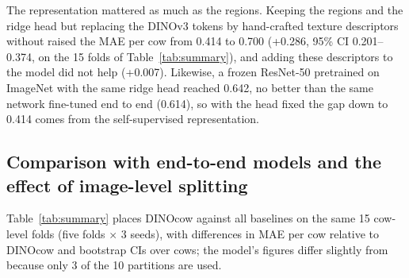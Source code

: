 \begin{table}[!htbp]
  \centering
  \caption{Region descriptor against simpler descriptors from the same frozen tokens (leave-one-cow-out).}
  \label{tab:regions}
\end{table}


\begin{cambio}
The representation mattered as much as the regions.
Keeping the regions and the ridge head but replacing the DINOv3 tokens by hand-crafted texture descriptors without  raised the MAE per cow from 0.414 to 0.700 (+0.286, 95\% CI 0.201--0.374, on the 15 folds of Table~\ref{tab:summary}), and adding these descriptors to the model did not help (+0.007).
Likewise, a frozen ResNet-50 pretrained on ImageNet with the same ridge head reached 0.642, no better than the same network fine-tuned end to end (0.614), so with the head fixed the gap down to 0.414 comes from the self-supervised representation.
\end{cambio}

\subsection{Comparison with end-to-end models and the effect of image-level splitting}
\label{sec:res-baselines}

Table~\ref{tab:summary} places DINOcow against all baselines on the same 15 cow-level folds (five folds $\times$ 3 seeds), with differences in MAE per cow relative to DINOcow and bootstrap CIs over cows; the model's figures differ slightly from \textit{} because only 3 of the 10 partitions are used.

